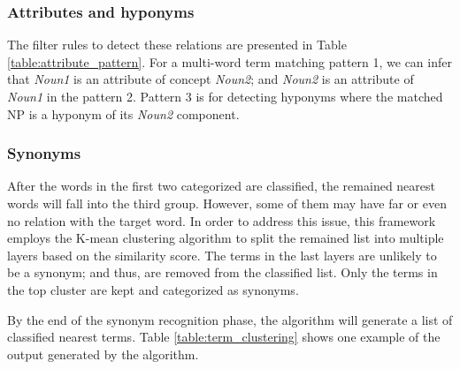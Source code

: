 \documentclass[Journal, BackFigs,NoLists, DoubleSpace]{ascelike}%
\begin{document}
\subsubsection{Attributes and hyponyms}
The filter rules to detect these relations are presented in Table \ref{table:attribute_pattern}. For a multi-word term matching pattern 1, we can infer that \textit{Noun1} is an attribute of concept \textit{Noun2}; and \textit{Noun2} is an attribute of \textit{Noun1} in the pattern 2. Pattern 3 is for detecting hyponyms where the matched NP is a hyponym of its \textit{Noun2} component.  
\subsubsection{Synonyms}
After the words in the first two categorized are classified, the remained nearest words will fall into the third group. However, some of them may have far or even no relation with the target word. In order to address this issue, this framework employs the K-mean clustering algorithm \cite{macqueen67} to split the remained list into multiple layers based on the similarity score. The terms in the last layers are unlikely to be a synonym; and thus, are removed from the classified list. Only the terms in the top cluster are kept and categorized as synonyms. 
\par
By the end of the synonym recognition phase, the algorithm will generate a list of classified nearest terms. Table \ref{table:term_clustering} shows one example of the output generated by the algorithm. 
%
\end{document}
